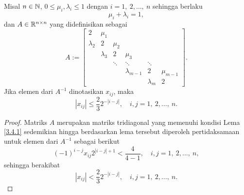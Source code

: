 \begin{lemma}\label{pertidaksamaanAInvers}
    Misal $n \in \mathbb{N}$, $0 \leq \mu_i,\lambda_i \leq 1$ dengan $i=1,~2,\dots,~n$ sehingga berlaku
    \begin{equation*}
        \mu_i + \lambda_i = 1,
    \end{equation*}
    dan $A \in \mathbb{R}^{n \times n}$ yang didefinisikan sebagai
    \begin{equation*}
        A:=
        \begin{bmatrix}
            2 & \mu_1 \\
            \lambda_2 & 2 & \mu_2 \\
            & \lambda_3 & 2 & \mu_3 \\
            && \ddots & \ddots & \ddots \\
            &&&\lambda_{m-1} & 2 & \mu_{m-1} \\
            &&&&\lambda_{m} & 2
        \end{bmatrix}.
    \end{equation*}
    Jika elemen dari $A^{-1}$ dinotasikan $x_{ij}$, maka
    \begin{equation*}
        |x_{ij}| \leq \frac{2}{3} 2^{-|i-j|},\quad  i,j=1,~2,\dots,~n.
    \end{equation*}
\end{lemma}
\begin{proof}
    Matriks $A$ merupakan matriks tridiagonal yang memenuhi kondisi Lema \ref{3.4.1} sedemikian hingga berdasarkan lema tersebut diperoleh pertidaksamaan untuk elemen dari $A^{-1}$ sebagai berikut
    \begin{equation*}
        (-1)^{i-j}x_{ij} 2^{|i-j|+1}<\frac{4}{4 - 1}, \quad i,j=1,~2,\dots,~n,
    \end{equation*}
    sehingga berakibat
    \begin{equation*}
        |x_{ij}|<\frac{2}{3} 2^{-|i-j|}, \quad i,j=1,~2,\dots,~n.
    \end{equation*}
\end{proof}
